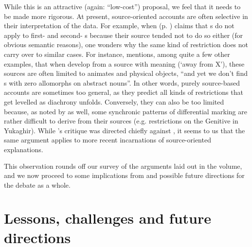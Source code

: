 \documentclass[output=paper]{langsci/langscibook}
\begin{document}
While this is an attractive (again: “low-cost”) proposal, we feel that it needs to be made more rigorous. At present, source-oriented accounts are often selective in their interpretation of the data. For example, when  (p. \pageref{p:cristofaro:ergatives}) claims that s do not apply to first- and second- s because their  source tended not to do so either (for obvious semantic reasons), one wonders why the same kind of restriction does not carry over to similar cases. For instance, \citet[36]{Kiparsky2008} mentions, among quite a few other examples, that when  develop from a source with  meaning (‘away from X’), these sources are often limited to animates and physical objects, “and yet we don't find s with zero allomorphs on abstract nouns”. In other words, purely source-based accounts are sometimes too general, as they predict all kinds of restrictions that get levelled as diachrony unfolds. Conversely, they can also be too limited because, as noted by \citet{Kiparsky2008} as well, some synchronic patterns of differential marking are rather difficult to derive from their sources (e.g.  restrictions on the Genitive in Yukaghir). While ’s critique was directed chiefly against \citet{Garrett1990}, it seems to us that the same argument applies to more recent incarnations of source-oriented explanations.

\largerpage[2]
This observation rounds off our survey of the arguments laid out in the volume, and we now proceed to some implications from and possible future directions for the debate as a whole.

\section{Lessons, challenges and future directions}\label{sec:epilogue:2}
\end{document}
